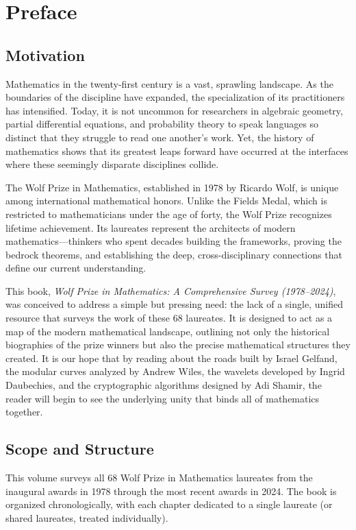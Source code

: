 \chapter*{Preface}

\section*{Motivation}

Mathematics in the twenty-first century is a vast, sprawling landscape. As the boundaries of the discipline have expanded, the specialization of its practitioners has intensified. Today, it is not uncommon for researchers in algebraic geometry, partial differential equations, and probability theory to speak languages so distinct that they struggle to read one another's work. Yet, the history of mathematics shows that its greatest leaps forward have occurred at the interfaces where these seemingly disparate disciplines collide.

The Wolf Prize in Mathematics, established in 1978 by Ricardo Wolf, is unique among international mathematical honors. Unlike the Fields Medal, which is restricted to mathematicians under the age of forty, the Wolf Prize recognizes lifetime achievement. Its laureates represent the architects of modern mathematics—thinkers who spent decades building the frameworks, proving the bedrock theorems, and establishing the deep, cross-disciplinary connections that define our current understanding.

This book, \textit{Wolf Prize in Mathematics: A Comprehensive Survey (1978--2024)}, was conceived to address a simple but pressing need: the lack of a single, unified resource that surveys the work of these 68 laureates. It is designed to act as a map of the modern mathematical landscape, outlining not only the historical biographies of the prize winners but also the precise mathematical structures they created. It is our hope that by reading about the roads built by Israel Gelfand, the modular curves analyzed by Andrew Wiles, the wavelets developed by Ingrid Daubechies, and the cryptographic algorithms designed by Adi Shamir, the reader will begin to see the underlying unity that binds all of mathematics together.

\section*{Scope and Structure}

This volume surveys all 68 Wolf Prize in Mathematics laureates from the inaugural awards in 1978 through the most recent awards in 2024. The book is organized chronologically, with each chapter dedicated to a single laureate (or shared laureates, treated individually). 

